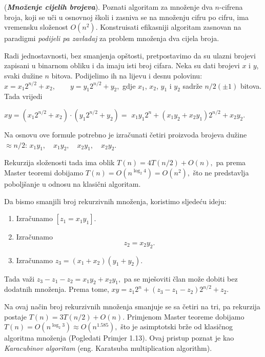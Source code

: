 \begin{example}
	(\textbf{\textit{Množenje cijelih brojeva}}). Poznati algoritam za množenje dva $n$-cifrena broja, koji se uči u osnovnoj školi i zasniva se na množenju cifru po cifru, ima vremensku složenost $O(n^2)$. Konstruisati efikasniji algoritam zasnovan na paradigmi \emph{podijeli pa zavladaj} za problem množenja dva cijela broja.
\end{example}

\begin{solution}
	
	Radi jednostavnosti, bez smanjenja opštosti, pretpostavimo da su ulazni brojevi zapisani u binarnom obliku i da imaju isti broj cifara. Neka su dati brojevi $x$ i $y$, svaki dužine $n$ bitova. Podijelimo ih na lijevu i desnu polovinu: $
	x = x_1 2^{n/2} + x_2,
	\qquad
	y = y_1 2^{n/2} + y_2,
	$ gdje $x_1$, $x_2$, $y_1$ i $y_2$ sadrže $n/2 (\pm 1)$ bitova. 	Tada vrijedi
	
	$
	xy = (x_1 2^{n/2} + x_2)\cdot (y_1 2^{n/2} + y_2) =$ 
	$x_1y_1 2^n
	+
	(x_1y_2 + x_2y_1)2^{n/2}
	+
	x_2y_2.
	$
	
	Na osnovu ove formule potrebno je izračunati četiri proizvoda brojeva dužine $ \approx n/2$: $
	x_1y_1,\quad
	x_1y_2,\quad
	x_2y_1,\quad
	x_2y_2.
	$
	
	Rekurzija složenosti tada ima oblik $T(n)=4T(n/2)+O(n),$ pa prema Master teoremi dobijamo $T(n)=O(n^{\log_2 4})=O(n^2),$	što ne predstavlja poboljšanje u odnosu na klasični algoritam.
	
	Da bismo smanjili broj rekurzivnih množenja, koristimo sljedeću ideju:
	
	\begin{enumerate}
		\item Izračunamo $[
		z_1=x_1y_1]$.
		\item Izračunamo
		\[
		z_2=x_2y_2.
		\]
		\item Izračunamo $
		z_3=(x_1+x_2)(y_1+y_2).$
		
	\end{enumerate}
	
	Tada važi $z_3-z_1-z_2=
	x_1y_2+x_2y_1, $ 	pa se mješoviti član može dobiti bez dodatnih množenja. Prema tome, $xy=z_1 2^n	+	(z_3-z_1-z_2)2^{n/2} + z_2.$
	
	Na ovaj način broj rekurzivnih množenja smanjuje se sa četiri na tri, pa rekurzija postaje $T(n)=3T(n/2)+O(n).$ Primjenom Master teoreme dobijamo $T(n)=O(n^{\log_2 3})
	\approx O(n^{1.585}),$ što je asimptotski brže od klasičnog algoritma množenja (Pogledati Primjer 1.13). Ovaj pristup poznat je kao \textit{Karacubinov algoritam} (eng. {Karatsuba multiplication algorithm}).
\end{solution}

